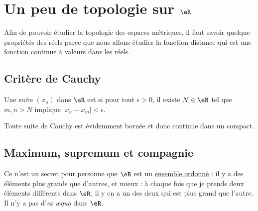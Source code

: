 \section{Un peu de topologie sur $\eR$}

Afin de pouvoir étudier la topologie des espaces métriques, il faut savoir quelque propriétés des réels parce que nous allons étudier la fonction distance qui est une fonction continue à valeurs dans les réels.

\subsection{Critère de Cauchy}

\begin{definition}
    Une suite \( (x_n)\) dans \( \eR\) est  si pour tout \( \epsilon>0\), il existe \( N\in \eN\) tel que \( m,n>N\) implique \( | x_n-x_m |<\epsilon\).
\end{definition}

Toute suite de Cauchy est évidemment bornée et donc continue dans un compact.

\subsection{Maximum, supremum et compagnie}


Ce n'est un secret pour personne que $\eR$ est un \href{http://fr.wikipedia.org/wiki/Relation_d'ordre}{ensemble ordonné} : il y a des éléments plus grands que d'autres, et mieux : à chaque fois que je prends deux éléments différents dans $\eR$, il y en a un des deux qui est plus grand que l'autre. Il n'y a pas d'\emph{ex æquo} dans $\eR$.

